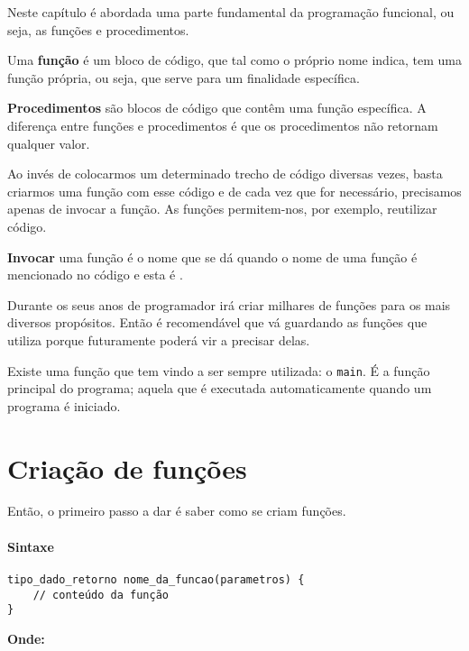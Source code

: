 Neste capítulo é abordada uma parte fundamental da programação funcional, ou seja, as funções e procedimentos.

\begin{defi}
Uma \textbf{função} é um bloco de código, que tal como o próprio nome indica, tem uma função própria, ou seja, que serve para um finalidade específica.
\end{defi}

\begin{defi}
\textbf{Procedimentos} são blocos de código que contêm uma função específica. A diferença entre funções e procedimentos é que os procedimentos não retornam qualquer valor.
\end{defi}

Ao invés de colocarmos um determinado trecho de código diversas vezes, basta criarmos uma função com esse código e de cada vez que for necessário, precisamos apenas de invocar a função. As funções permitem-nos, por exemplo, reutilizar código.

\begin{defi}
\textbf{Invocar} uma função é o nome que se dá quando o nome de uma função é mencionado no código e esta é .
\end{defi}

Durante os seus anos de programador irá criar milhares de funções para os mais diversos propósitos. Então é recomendável que vá guardando as funções que utiliza porque futuramente poderá vir a precisar delas.

Existe uma função que tem vindo a ser sempre utilizada: o \texttt{main}. É a função principal do programa; aquela que é executada automaticamente quando um programa é iniciado. 

\section{Criação de funções}

Então, o primeiro passo a dar é saber como se criam funções.

\paragraph{Sintaxe}

\begin{lstlisting}
tipo_dado_retorno nome_da_funcao(parametros) {
    // conteúdo da função
}
\end{lstlisting}

\textbf{Onde:}

